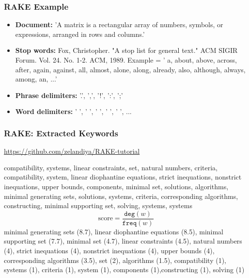 \documentclass{beamer}
\begin{document}
\begin{frame}
\frametitle{RAKE Example}
\begin{itemize}
\item \textbf{Document:} 'A matrix is a rectangular array of numbers, symbols, or expressions, arranged in rows and columns.'
\vspace{0.3cm}
\item \textbf{Stop words:} Fox, Christopher. "A stop list for general text." ACM SIGIR Forum. Vol. 24. No. 1-2. ACM, 1989.
\vspace{0.3cm}
Example = ' a, about, above, across, after, again, against, all, almost, alone, along, already, also, although, always, among, an, ...'
\item \textbf{Phrase delimiters:} '.', ',', '!', ':', ';'
\vspace{0.3cm}
\item \textbf{Word delimiters:} ' ', '  ', '   ', '    ', '     ', ...
\end{itemize}
\end{frame}

\begin{frame}
\frametitle{RAKE: Extracted Keywords}

\url{https://github.com/zelandiya/RAKE-tutorial}

\vspace{0.1in}
compatibility, systems, linear constraints, set, natural numbers, criteria, compatibility, system, linear diophantine equations, strict inequations, nonstrict inequations, upper bounds, components, minimal set, solutions, algorithms, minimal generating sets, solutions, systems, criteria, corresponding algorithms, constructing, minimal supporting set, solving, systems, systems
\pause
\[
\text{score} = \frac{\texttt{deg}(w)}{\texttt{freq}(w)}
\]
\pause
minimal generating sets (8.7), linear diophantine equations (8.5), minimal supporting set (7.7), minimal set (4.7), linear constraints (4.5), natural numbers (4), strict inequations (4), nonstrict inequations (4), upper bounds (4), corresponding algorithms (3.5), set (2), algorithms (1.5), compatibility (1), systems (1), criteria (1), system (1), components (1),constructing (1), solving (1)
\end{frame}
\end{document}
